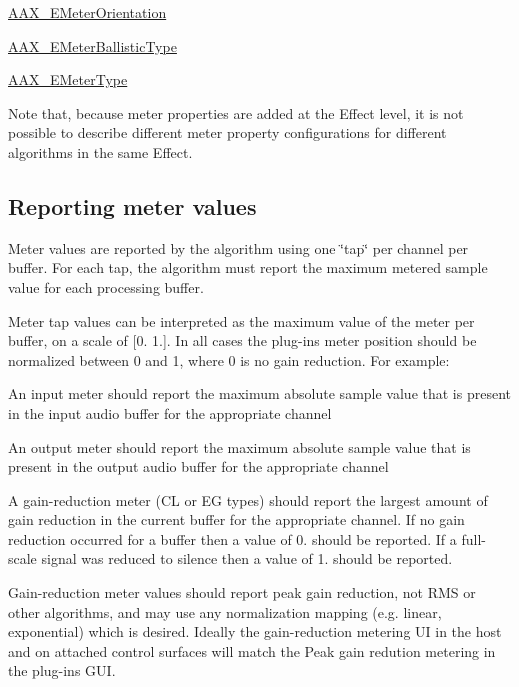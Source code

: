 \begin{DoxyItemize}
\item \hyperlink{a00206_af260f0f9a6bff0f7bfd3200b2947c96b}{A\+A\+X\+\_\+\+E\+Meter\+Orientation} \item \hyperlink{a00206_a9aaedbe356691c4e4584fa7ccdbcc776}{A\+A\+X\+\_\+\+E\+Meter\+Ballistic\+Type} \item \hyperlink{a00206_a590815545eaf0d3be0bb8f656fe2a761}{A\+A\+X\+\_\+\+E\+Meter\+Type}\end{DoxyItemize}
Note that, because meter properties are added at the Effect level, it is not possible to describe different meter property configurations for different algorithms in the same Effect.\hypertarget{a00337_AdditionalFeatures_Meters_reporting}{}\subsection{Reporting meter values}\label{a00337_AdditionalFeatures_Meters_reporting}
Meter values are reported by the algorithm using one \char`\"{}tap\char`\"{} per channel per buffer. For each tap, the algorithm must report the maximum metered sample value for each processing buffer.

Meter tap values can be interpreted as the maximum value of the meter per buffer, on a scale of \mbox{[}0. 1.\mbox{]}. In all cases the plug-\/in\textquotesingle{}s meter position should be normalized between 0 and 1, where 0 is no gain reduction. For example\+:

\begin{DoxyItemize}
\item An input meter should report the maximum absolute sample value that is present in the input audio buffer for the appropriate channel \item An output meter should report the maximum absolute sample value that is present in the output audio buffer for the appropriate channel \item A gain-\/reduction meter (C\+L or E\+G types) should report the largest amount of gain reduction in the current buffer for the appropriate channel. If no gain reduction occurred for a buffer then a value of 0. should be reported. If a full-\/scale signal was reduced to silence then a value of 1. should be reported.\end{DoxyItemize}
Gain-\/reduction meter values should report peak gain reduction, not R\+M\+S or other algorithms, and may use any normalization mapping (e.\+g. linear, exponential) which is desired. Ideally the gain-\/reduction metering U\+I in the host and on attached control surfaces will match the Peak gain redution metering in the plug-\/in\textquotesingle{}s G\+U\+I.

